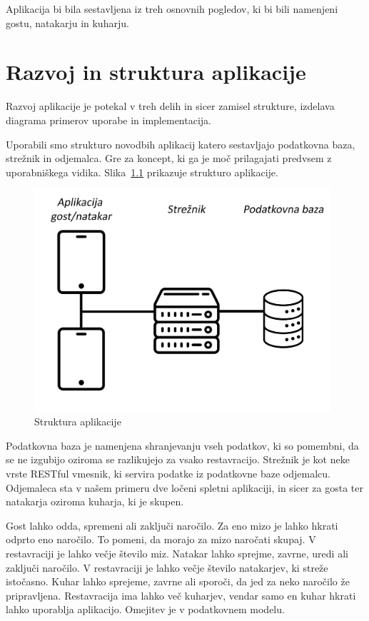 \documentclass[a4paper, 12pt]{book}
\begin{document}
Aplikacija bi bila sestavljena iz treh osnovnih pogledov, ki bi bili namenjeni gostu, natakarju in kuharju. 

\chapter{Razvoj in struktura aplikacije}

Razvoj aplikacije je potekal v treh delih in sicer zamisel strukture, izdelava diagrama primerov uporabe in implementacija.

Uporabili smo strukturo novodbih aplikacij katero sestavljajo podatkovna baza, strežnik in odjemalca. Gre za koncept, ki ga je moč prilagajati predvsem z uporabniškega vidika. Slika~\ref{StrukApk} prikazuje strukturo aplikacije.

\begin{figure}[!htb]
\centering
\includegraphics[width=11cm]{Skica1.jpg}
\caption{Struktura aplikacije}
\label{StrukApk}
\end{figure}

Podatkovna baza je namenjena shranjevanju vseh podatkov, ki so pomembni, da se ne izgubijo oziroma se razlikujejo za vsako restavracijo. 
Strežnik je kot neke vrste RESTful vmesnik, ki servira podatke iz podatkovne baze odjemalcu. 
Odjemaleca sta v našem primeru dve ločeni spletni aplikaciji, in sicer za gosta ter natakarja oziroma kuharja, ki je skupen.

Gost lahko odda, spremeni ali zaključi naročilo. Za eno mizo je lahko hkrati odprto eno naročilo. To pomeni, da morajo za mizo naročati skupaj. V restavraciji je lahko večje število miz.
Natakar lahko sprejme, zavrne, uredi ali zaključi naročilo. V restavraciji je lahko večje število natakarjev, ki streže istočasno. 
Kuhar lahko sprejeme, zavrne ali sporoči, da jed za neko naročilo že pripravljena. Restavracija ima lahko več kuharjev, vendar samo en kuhar hkrati lahko uporablja aplikacijo. Omejitev je v podatkovnem modelu.
\end{document}
